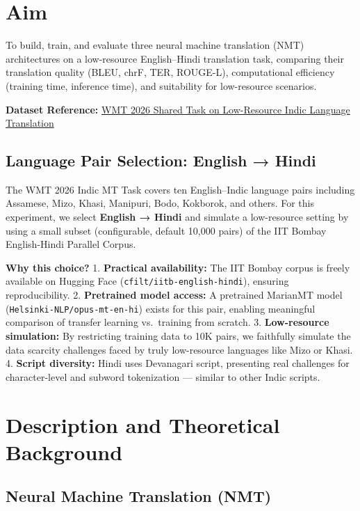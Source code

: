 \documentclass[12pt,a4paper,oneside]{report}
\begin{document}
\section{Aim}
To build, train, and evaluate three neural machine translation (NMT) architectures on a low-resource English--Hindi translation task, comparing their translation quality (BLEU, chrF, TER, ROUGE-L), computational efficiency (training time, inference time), and suitability for low-resource scenarios.

\textbf{Dataset Reference:} \href{https://www2.statmt.org/wmt26/indic-mt-task.html}{WMT 2026 Shared Task on Low-Resource Indic Language Translation}

\hypertarget{language-pair-selection-english-hindi}{%
\subsection{Language Pair Selection: English → Hindi}\label{language-pair-selection-english-hindi}}

The WMT 2026 Indic MT Task covers ten English--Indic language pairs including Assamese, Mizo, Khasi, Manipuri, Bodo, Kokborok, and others. For this experiment, we select \textbf{English → Hindi} and simulate a low-resource setting by using a small subset (configurable, default 10,000 pairs) of the IIT Bombay English-Hindi Parallel Corpus.

\textbf{Why this choice?}
1. \textbf{Practical availability:} The IIT Bombay corpus is freely available on Hugging Face (\texttt{cfilt/iitb-english-hindi}), ensuring reproducibility.
2. \textbf{Pretrained model access:} A pretrained MarianMT model (\texttt{Helsinki-NLP/opus-mt-en-hi}) exists for this pair, enabling meaningful comparison of transfer learning vs.~training from scratch.
3. \textbf{Low-resource simulation:} By restricting training data to 10K pairs, we faithfully simulate the data scarcity challenges faced by truly low-resource languages like Mizo or Khasi.
4. \textbf{Script diversity:} Hindi uses Devanagari script, presenting real challenges for character-level and subword tokenization --- similar to other Indic scripts.

\section{Description and Theoretical Background}
\hypertarget{neural-machine-translation-nmt}{%
\subsection{Neural Machine Translation (NMT)}\label{neural-machine-translation-nmt}}
\end{document}
